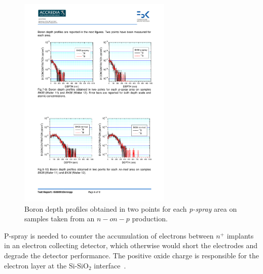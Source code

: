 \begin{figure}[!htbp]
\centering
\includegraphics[width=0.65\textwidth]{sims_pspray.pdf}
\caption{\label{fig:sims_pspray}Boron depth profiles obtained in two points for each {\it p-spray} area 
on samples taken from an $n-on-p$ production.}
\end{figure}

P-spray is needed to counter the accumulation of electrons between $n^+$ implants in an 
electron collecting detector, which otherwise would short the electrodes and degrade the 
detector performance. The positive oxide charge is responsible for the electron layer 
at the Si-SiO$_2$ interface~\cite{Lutz:411172}. 


